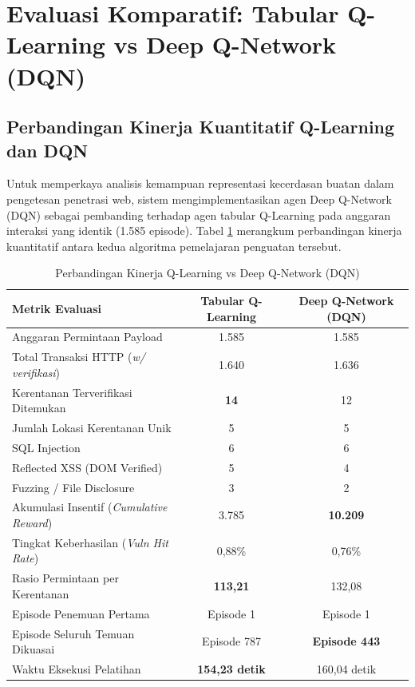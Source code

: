 \section{Evaluasi Komparatif: Tabular Q-Learning vs Deep Q-Network (DQN)}

\subsection{Perbandingan Kinerja Kuantitatif Q-Learning dan DQN}

Untuk memperkaya analisis kemampuan representasi kecerdasan buatan dalam pengetesan penetrasi web, sistem mengimplementasikan agen Deep Q-Network (DQN) sebagai pembanding terhadap agen tabular Q-Learning pada anggaran interaksi yang identik (1.585 episode). Tabel \ref{tab:comparison_ql_dqn} merangkum perbandingan kinerja kuantitatif antara kedua algoritma pemelajaran penguatan tersebut.

\begin{table}[htbp]
\centering
\caption{Perbandingan Kinerja Q-Learning vs Deep Q-Network (DQN)}
\label{tab:comparison_ql_dqn}
\small %
\setlength{\tabcolsep}{6pt} %
\begin{tabular}{l c c}
\toprule
\textbf{Metrik Evaluasi} & \textbf{Tabular Q-Learning} & \textbf{Deep Q-Network (DQN)} \\
\midrule
Anggaran Permintaan Payload & 1.585 & 1.585 \\
Total Transaksi HTTP (\textit{w/ verifikasi}) & 1.640 & 1.636 \\ 
Kerentanan Terverifikasi Ditemukan & \textbf{14} & 12 \\ 
Jumlah Lokasi Kerentanan Unik & 5 & 5 \\
SQL Injection & 6 & 6 \\
Reflected XSS (DOM Verified) & 5 & 4 \\ 
Fuzzing / File Disclosure & 3 & 2 \\
Akumulasi Insentif (\textit{Cumulative Reward}) & 3.785 & \textbf{10.209} \\ 
Tingkat Keberhasilan (\textit{Vuln Hit Rate}) & 0,88\% & 0,76\% \\ 
Rasio Permintaan per Kerentanan & \textbf{113,21} & 132,08 \\ 
Episode Penemuan Pertama & Episode 1 & Episode 1 \\
Episode Seluruh Temuan Dikuasai & Episode 787 & \textbf{Episode 443} \\
Waktu Eksekusi Pelatihan & \textbf{154,23 detik} & 160,04 detik \\ 
\bottomrule
\end{tabular}
\end{table}


